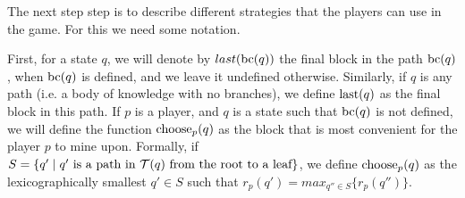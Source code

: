 \documentclass{article}
\begin{document}
The next step step is to describe different strategies that the players can use in the game. For this we need some notation. 

First, for a state $q$, we will denote by $last(\text{bc}(q))$ the final block in the path $\text{bc}(q)$, when $\text{bc}(q)$ is defined, and we leave it undefined otherwise. Similarly, if $q$ is any path (i.e. a body of knowledge with no branches), we define $\text{last}(q)$ as the final block in this path. If $p$ is a player, and $q$ is a state such that $\text{bc}(q)$ is not defined, we will define the function $\text{choose}_p(q)$ as the block that is most convenient for the player $p$ to mine upon. Formally, if $S=\{ q'\mid q' \text{ is a path in } \mathcal{T}(q) \text{ from the root to a leaf}\}$, we define $\text{choose}_p(q)$ as the lexicographically smallest $q'\in S$ such that $r_p(q')=max_{q''\in S} \{r_p(q'')\}$.

%
%
%
%
%
%
\end{document}

